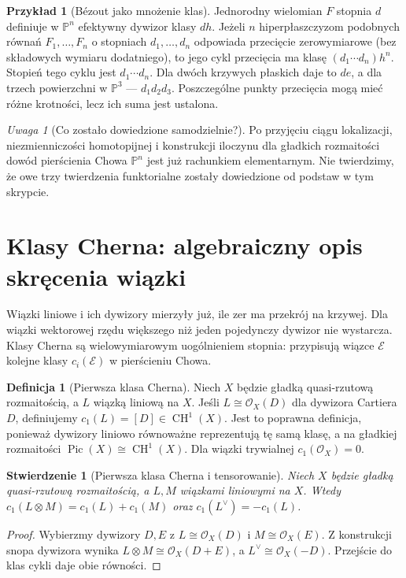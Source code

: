 \documentclass[11pt,a4paper,openany]{report}
\numberwithin{equation}{section}
\theoremstyle{plain}
\newtheorem{stwierdzenie}[twierdzenie]{Stwierdzenie}
\theoremstyle{definition}
\newtheorem{definicja}[twierdzenie]{Definicja}
\newtheorem{przyklad}[twierdzenie]{Przykład}
\theoremstyle{remark}
\newtheorem{uwaga}[twierdzenie]{Uwaga}
\newcommand{\PP}{\mathbb P}
\begin{document}
\begin{przyklad}[Bézout jako mnożenie klas]
\label{prz:ga7-bezout}
Jednorodny wielomian $F$ stopnia $d$ definiuje w
$\PP^n$ efektywny dywizor klasy $d h$.
Jeżeli $n$ hiperpłaszczyzom podobnych równań
$F_1,\ldots,F_n$ o stopniach $d_1,\ldots,d_n$
odpowiada przecięcie zerowymiarowe (bez składowych
wymiaru dodatniego), to jego cykl przecięcia ma klasę
$(d_1\cdots d_n)h^n$. Stopień tego cyklu jest
$d_1\cdots d_n$. Dla dwóch krzywych płaskich daje to
$de$, a dla trzech powierzchni w $\PP^3$ --- $d_1d_2d_3$.
Poszczególne punkty przecięcia mogą mieć różne krotności,
lecz ich suma jest ustalona.
\end{przyklad}

\begin{uwaga}[Co zostało dowiedzione samodzielnie?]
Po przyjęciu ciągu lokalizacji, niezmienniczości
homotopijnej i konstrukcji iloczynu dla gładkich
rozmaitości dowód pierścienia Chowa $\PP^n$ jest
już rachunkiem elementarnym. Nie twierdzimy, że
owe trzy twierdzenia funktorialne zostały dowiedzione
od podstaw w tym skrypcie.
\end{uwaga}

\section{Klasy Cherna: algebraiczny opis skręcenia wiązki}
\label{sec:ga7-chern}

Wiązki liniowe i ich dywizory mierzyły już, ile zer
ma przekrój na krzywej. Dla wiązki wektorowej rzędu
większego niż jeden pojedynczy dywizor nie wystarcza.
Klasy Cherna są wielowymiarowym uogólnieniem stopnia:
przypisują wiązce $\mathcal E$ kolejne klasy
$c_i(\mathcal E)$ w pierścieniu Chowa.

\begin{definicja}[Pierwsza klasa Cherna]
\label{def:ga7-c1}
Niech $X$ będzie gładką quasi-rzutową rozmaitością,
a $L$ wiązką liniową na $X$. Jeśli $L\cong\mathcal O_X(D)$
dla dywizora Cartiera $D$, definiujemy
$c_1(L)=[D]\in\operatorname{CH}^1(X)$.
Jest to poprawna definicja, ponieważ dywizory liniowo
równoważne reprezentują tę samą klasę, a na gładkiej
rozmaitości $\operatorname{Pic}(X)\cong\operatorname{CH}^1(X)$.
Dla wiązki trywialnej $c_1(\mathcal O_X)=0$.
\end{definicja}

\begin{stwierdzenie}[Pierwsza klasa Cherna i tensorowanie]
\label{st:ga7-c1-add}
Niech $X$ będzie gładką quasi-rzutową rozmaitością,
a $L,M$ wiązkami liniowymi na $X$. Wtedy
$c_1(L\otimes M)=c_1(L)+c_1(M)$ oraz
$c_1(L^\vee)=-c_1(L)$.
\end{stwierdzenie}
\begin{proof}
Wybierzmy dywizory $D,E$ z $L\cong\mathcal O_X(D)$
i $M\cong\mathcal O_X(E)$. Z konstrukcji snopa dywizora
wynika $L\otimes M\cong\mathcal O_X(D+E)$, a
$L^\vee\cong\mathcal O_X(-D)$.
Przejście do klas cykli daje obie równości.
\end{proof}
\end{document}
